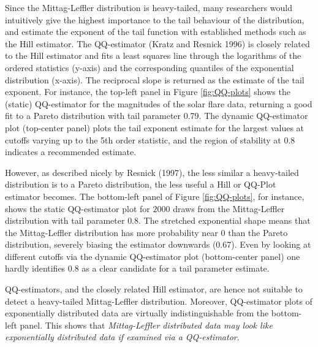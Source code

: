 \documentclass[smallextended]{svjour3}       %
\begin{document}
Since the Mittag-Leffler distribution is heavy-tailed, many researchers
would intuitively give the highest importance to the tail behaviour of
the distribution, and estimate the exponent of the tail function with
established methods such as the Hill estimator. The QQ-estimator (Kratz
and Resnick 1996) is closely related to the Hill estimator and fits a
least squares line through the logarithms of the ordered statistics
(y-axis) and the corresponding quantiles of the exponential distribution
(x-axis). The reciprocal slope is returned as the estimate of the tail
exponent. For instance, the top-left panel in Figure \ref{fig:QQ-plots}
shows the (static) QQ-estimator for the magnitudes of the solar flare
data, returning a good fit to a Pareto distribution with tail parameter
0.79. The dynamic QQ-estimator plot (top-center panel) plots the tail
exponent estimate for the largest values at cutoffs varying up to the
5th order statistic, and the region of stability at 0.8 indicates a
recommended estimate.

However, as described nicely by Resnick (1997), the less similar a
heavy-tailed distribution is to a Pareto distribution, the less useful a
Hill or QQ-Plot estimator becomes. The bottom-left panel of Figure
\ref{fig:QQ-plots}, for instance, shows the static QQ-estimator plot for
\(2000\) draws from the Mittag-Leffler distribution with tail parameter
\(0.8\). The stretched exponential shape means that the Mittag-Leffler
distribution has more probability near \(0\) than the Pareto
distribution, severely biasing the estimator downwards (0.67). Even by
looking at different cutoffs via the dynamic QQ-estimator plot
(bottom-center panel) one hardly identifies \(0.8\) as a clear candidate
for a tail parameter estimate.

QQ-estimators, and the closely related Hill estimator, are hence not
suitable to detect a heavy-tailed Mittag-Leffler distribution. Moreover,
QQ-estimator plots of exponentially distributed data are virtually
indistinguishable from the bottom-left panel. This shows that
\emph{Mittag-Leffler distributed data may look like exponentially
distributed data if examined via a QQ-estimator}.
\end{document}
